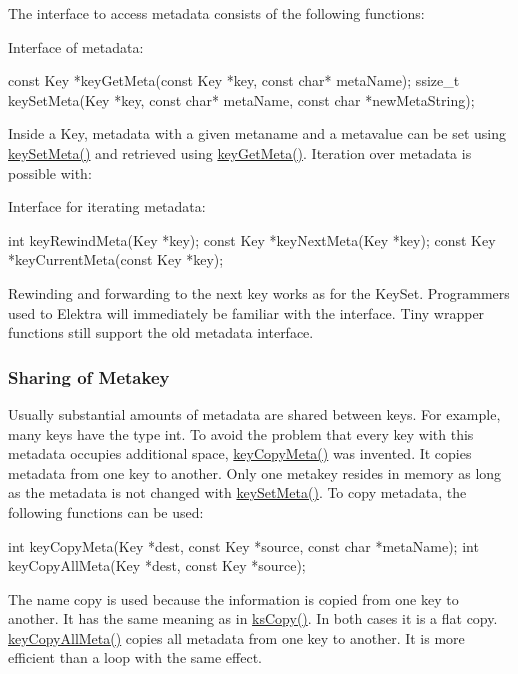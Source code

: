 The interface to access metadata consists of the following functions\+:

Interface of metadata\+: \begin{DoxyVerb}    const Key *keyGetMeta(const Key *key, const char* metaName);
    ssize_t    keySetMeta(Key *key, const char* metaName,
            const char *newMetaString);
\end{DoxyVerb}


Inside a {\ttfamily Key}, metadata with a given metaname and a metavalue can be set using {\ttfamily \hyperlink{group__keymeta_gae1f15546b234ffb6007d8a31178652b9}{key\+Set\+Meta()}} and retrieved using {\ttfamily \hyperlink{group__keymeta_ga9ed3875495ddb3d8a8d29158a60a147c}{key\+Get\+Meta()}}. Iteration over metadata is possible with\+:

Interface for iterating metadata\+: \begin{DoxyVerb}    int keyRewindMeta(Key *key);
    const Key *keyNextMeta(Key *key);
    const Key *keyCurrentMeta(const Key *key);
\end{DoxyVerb}


Rewinding and forwarding to the next key works as for the {\ttfamily Key\+Set}. Programmers used to Elektra will immediately be familiar with the interface. Tiny wrapper functions still support the old metadata interface.

\subsubsection*{Sharing of Metakey}

Usually substantial amounts of metadata are shared between keys. For example, many keys have the type {\ttfamily int}. To avoid the problem that every key with this metadata occupies additional space, {\ttfamily \hyperlink{group__keymeta_ga9a22b992478e613c8788bd460b4a1f0c}{key\+Copy\+Meta()}} was invented. It copies metadata from one key to another. Only one metakey resides in memory as long as the metadata is not changed with {\ttfamily \hyperlink{group__keymeta_gae1f15546b234ffb6007d8a31178652b9}{key\+Set\+Meta()}}. To copy metadata, the following functions can be used\+: \begin{DoxyVerb}    int keyCopyMeta(Key *dest, const Key *source, const char *metaName);
    int keyCopyAllMeta(Key *dest, const Key *source);
\end{DoxyVerb}


The name {\ttfamily copy} is used because the information is copied from one key to another. It has the same meaning as in {\ttfamily \hyperlink{group__keyset_gaba1f1dbea191f4d7e7eb3e4296ae7d5e}{ks\+Copy()}}. In both cases it is a flat copy. {\ttfamily \hyperlink{group__keymeta_ga8e63720a65610a29597494d0671f9401}{key\+Copy\+All\+Meta()}} copies all metadata from one key to another. It is more efficient than a loop with the same effect.

